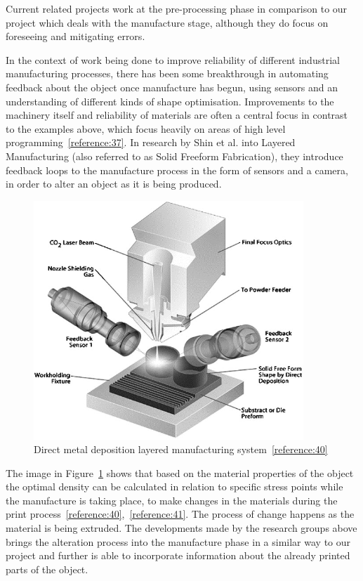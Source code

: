 \documentclass[11pt]{article} %
\begin{document}
Current related projects work at the pre-processing phase in comparison to our project which deals with the manufacture stage, although they do focus on foreseeing and mitigating errors. 

In the context of work being done to improve reliability of different industrial manufacturing processes, there has been some breakthrough in automating feedback about the object once manufacture has begun, using sensors and an understanding of different kinds of shape optimisation. Improvements to the machinery itself and reliability of materials are often a central focus in contrast to the examples above, which focus heavily on areas of high level programming~\ref{reference:37}. In research by Shin et al. into Layered Manufacturing (also referred to as Solid Freeform Fabrication), they introduce feedback loops to the manufacture process in the form of sensors and a camera, in order to alter an object as it is being produced.

\begin{figure}[H]
  \centering
  \includegraphics[width=4in]{shin.jpg}
  \caption{Direct metal deposition layered manufacturing system~\ref{reference:40}}
  \label{figure:Shin}
\end{figure}

The image in Figure~\ref{figure:Shin} shows that based on the material properties of the object the optimal density can be calculated in relation to specific stress points while the manufacture is taking place, to make changes in the materials during the print process~\ref{reference:40},~\ref{reference:41}. The process of change happens as the material is being extruded. The developments made by the research groups above brings the alteration process into the manufacture phase in a similar way to our project and further is able to incorporate information about the already printed parts of the object.  
\end{document}

